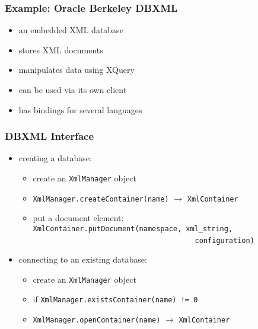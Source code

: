 \documentclass[dvipsnames]{beamer}
\theoremstyle{plain}
\begin{document}
\begin{frame}
  \frametitle{Example: Oracle Berkeley DBXML}

  \begin{itemize}
    \item an embedded XML database
    \item stores XML documents
    \item manipulates data using XQuery
    \item can be used via its own client
    \item has bindings for several languages
  \end{itemize}
\end{frame}

\begin{frame}
  \frametitle{DBXML Interface}

  \begin{itemize}
    \item creating a database:\\
    \begin{itemize}
      \item create an \lstinline!XmlManager! object
      \item \lstinline!XmlManager.createContainer(name)!
        $\rightarrow$ \lstinline!XmlContainer!
      \item put a document element:\\
        \lstinline!XmlContainer.putDocument(namespace, xml_string,!\\
        ~~~~~~~~~~~~~~~~~~~~~~~~~~~~~~~~~~~~~~~\lstinline!configuration)!
    \end{itemize}

    \pause
    \item connecting to an existing database:\\
    \begin{itemize}
      \item create an \lstinline!XmlManager! object
      \item if \lstinline?XmlManager.existsContainer(name) != 0?
      \item \lstinline!XmlManager.openContainer(name)!
        $\rightarrow$ \lstinline!XmlContainer!
    \end{itemize}
  \end{itemize}
\end{frame}
\end{document}
